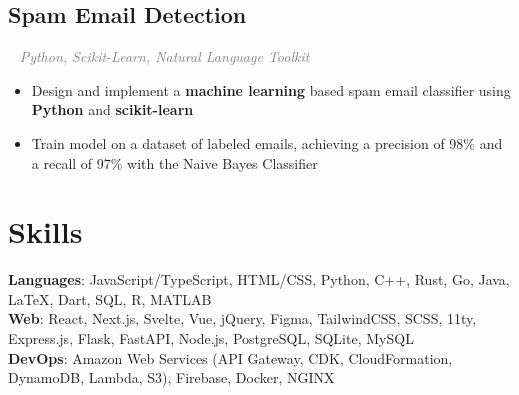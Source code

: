 \documentclass{article}
\newcommand{\resumesection}[3]{
    \subsection*{#1}
    \ 
    \normalsize
    \normalsize
    \hfill
    \textcolor{black}{#3}
    \normalsize
    \newline
    \small
    \textcolor{grey}{\emph{#2}}
}
\newcommand{\projectsection}[3]{
    \subsection*{#1}
    \ 
    \small
    \textcolor{grey}{\emph{#2}}
    \normalsize
    \hfill
    \textcolor{black}{#3}
    \small
}
\begin{document}
\projectsection{Spam Email Detection}{Python, Scikit-Learn, Natural Language Toolkit}{}
\begin{itemize}
    \item Design and implement a \textbf{machine learning} based spam email classifier using \textbf{Python} and \textbf{scikit-learn}
    \item Train model on a dataset of labeled emails, achieving a precision of 98\% and a recall of 97\% with the Naive Bayes Classifier
\end{itemize}



\section*{Skills}
\textbf{Languages}: JavaScript/TypeScript, HTML/CSS, Python, C++, Rust, Go, Java, {\selectfont\LaTeX}, Dart, SQL, R, MATLAB\\
\textbf{Web}: React, Next.js, Svelte, Vue, jQuery, Figma, TailwindCSS, SCSS, 11ty, Express.js, Flask, FastAPI, Node.js, PostgreSQL, SQLite, MySQL\\
\textbf{DevOps}: Amazon Web Services (API Gateway, CDK, CloudFormation, DynamoDB, Lambda, S3), Firebase, Docker, NGINX\\
\end{document}
